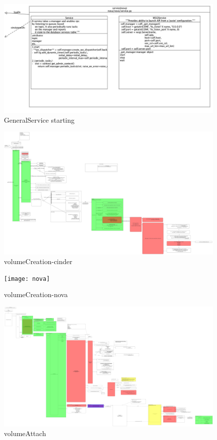 \documentclass[10pt]{report}
\begin{document}
			\begin{figure}[!htbp]
				\includegraphics[width=\textwidth,height=\textheight,keepaspectratio] {service}
				\caption{GeneralService starting}
				\label{service}
			\end{figure}
			\begin{figure}[!htbp]
				\includegraphics[width=\textwidth,height=\textheight,keepaspectratio] {cinder}
				\caption{volumeCreation-cinder}
				\label{cinder}
			\end{figure}
			\begin{figure}[!htbp]
				\texttt{[image: nova]}
				\caption{volumeCreation-nova}
				\label{nova}
				\end{figure}
			\begin{figure}[!htbp]
				\includegraphics[width=\textwidth,height=\textheight,keepaspectratio] {attach}
				\caption{volumeAttach}
				\label{attach}
			\end{figure}
			\newpage
\end{document}
